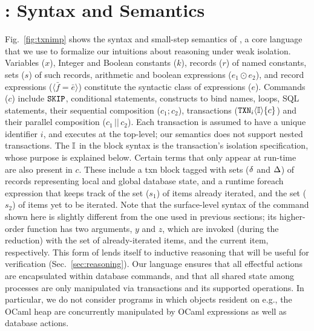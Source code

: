 \section{\txnimp: Syntax and Semantics}
\label{sec:opsem}

\label{sec:syntax}



Fig.~\ref{fig:txnimp} shows the syntax and small-step semantics of
\txnimp, a core language that we use to formalize our intuitions about
reasoning under weak isolation. Variables ($x$), Integer and Boolean
constants ($k$), records ($r$) of named constants, sets ($s$) of such
records, arithmetic and boolean expressions ($e_1 \odot e_2$), and
record expressions ($\langle \bar{f}=\bar{e} \rangle$) constitute the
syntactic class of expressions ($e$). Commands ($c$) include ${\tt SKIP}$,
conditional statements,  constructs to bind names, 
loops, SQL statements, their sequential composition ($c_1;c_2$),
transactions (${\tt TXN}_{i}\langle \mathbb{I} \rangle\{c\}$) and their parallel composition
($c_1\,||\,c_2$). Each transaction is assumed to have a unique
identifier $i$, and executes at the top-level; our semantics does not
support nested transactions. The $\mathbb{I}$ in the  block syntax is
the transaction's isolation specification, whose purpose is explained
below.  Certain terms that only appear at run-time are also present in
$c$.  These include a {\sf txn} block tagged with sets ($\delta$ and
$\Delta$) of records representing local and global database state, and a
runtime {\sf foreach} expression that keeps track of the set ($s_1$)
of items already iterated, and the set ($s_2$) of items yet to be
iterated. Note that the surface-level syntax of the 
command shown here is slightly different from the one used in previous
sections; its higher-order function has two arguments, $y$ and $z$,
which are invoked (during the reduction) with the set of
already-iterated items, and the current item, respectively. This form
of  lends itself to inductive reasoning that will be useful
for verification (Sec.~\ref{sec:reasoning}). Our language ensures
that all effectful actions are encapsulated within database commands,
and that all shared state among processes are only manipulated via
transactions and its supported operations.  In particular, we do not
consider programs in which objects resident on e.g., the OCaml heap
are concurrently manipulated by OCaml expressions as well as database
actions.



